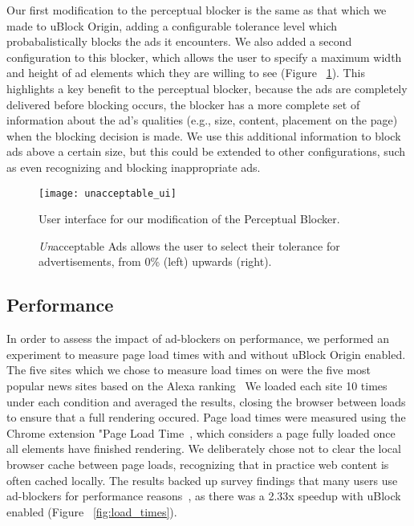 Our first modification to the perceptual blocker is the same as that which we made to uBlock Origin, adding a configurable tolerance level which probabalistically blocks the ads it encounters.
We also added a second configuration to this blocker, which allows the user to specify a maximum width and height of ad elements which they are willing to see (Figure ~\ref{fig:unacceptable_ui}).
This highlights a key benefit to the perceptual blocker, because the ads are completely delivered before blocking occurs, the blocker has a more complete set of information about the ad's qualities (e.g., size, content, placement on the page) when the blocking decision is made.
We use this additional information to block ads above a certain size, but this could be extended to other configurations, such as even recognizing and blocking inappropriate ads.

\begin{figure}[h]
\centering
\texttt{[image: unacceptable\_ui]}
\caption{User interface for our modification of the Perceptual Blocker.}
\label{fig:unacceptable_ui}
\end{figure}

\begin{figure}[h]
\hfill
{}
\hfill
{}
\hfill
\caption{\textit{Un}acceptable Ads allows the user to select their tolerance for advertisements, from 0\% (left) upwards (right).}
\label{fig:unacceptable}
\end{figure}

\subsection{Performance}
In order to assess the impact of ad-blockers on performance, we performed an experiment to measure page load times with and without uBlock Origin enabled.
The five sites which we chose to measure load times on were the five most popular news sites based on the Alexa ranking~\cite{alexa}
We loaded each site 10 times under each condition and averaged the results, closing the browser between loads to ensure that a full rendering occured.
Page load times were measured using the Chrome extension "Page Load Time~\cite{pageloadtime}, which considers a page fully loaded once all elements have finished rendering.
We deliberately chose not to clear the local browser cache between page loads, recognizing that in practice web content is often cached locally.
The results backed up survey findings that many users use ad-blockers for performance reasons~\cite{hubspot2016adblock}, as there was a 2.33x speedup with uBlock enabled (Figure ~\ref{fig:load_times}).

